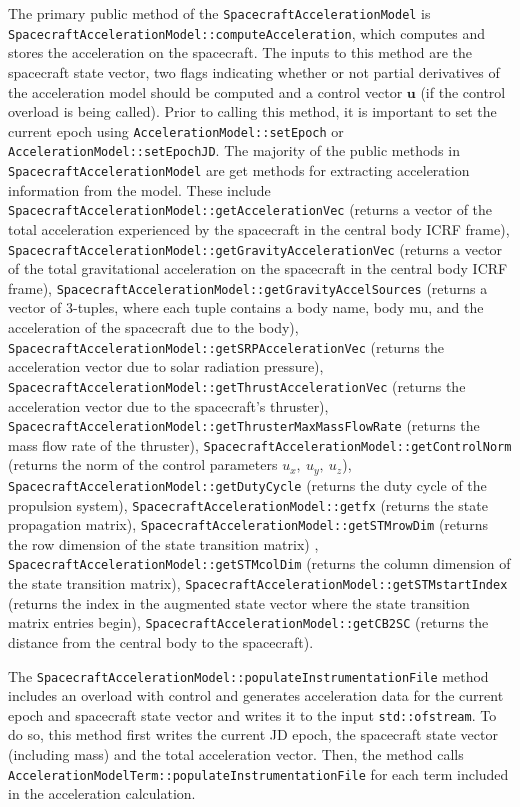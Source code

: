 The primary public method of the \texttt{SpacecraftAccelerationModel} is \texttt{SpacecraftAccelerationModel::computeAcceleration}, which computes and stores the acceleration on the spacecraft. The inputs to this method are the spacecraft state vector, two flags indicating whether or not partial derivatives of the acceleration model should be computed and a control vector $\mathbf{u}$ (if the control overload is being called). Prior to calling this method, it is important to set the current epoch using \texttt{AccelerationModel::setEpoch} or \texttt{AccelerationModel::setEpochJD}. The majority of the public methods in \texttt{SpacecraftAccelerationModel} are get methods for extracting acceleration information from the model. These include \texttt{SpacecraftAccelerationModel::getAccelerationVec} (returns a vector of the total acceleration experienced by the spacecraft in the central body ICRF frame), \texttt{SpacecraftAccelerationModel::getGravityAccelerationVec} (returns a vector of the total gravitational acceleration on the spacecraft in the central body ICRF frame), \texttt{SpacecraftAccelerationModel::getGravityAccelSources} (returns a vector of 3-tuples, where each tuple contains a body name, body mu, and the acceleration of the spacecraft due to the body), \texttt{SpacecraftAccelerationModel::getSRPAccelerationVec} (returns the acceleration vector due to solar radiation pressure), \texttt{SpacecraftAccelerationModel::getThrustAccelerationVec} (returns the acceleration vector due to the spacecraft's thruster), \texttt{SpacecraftAccelerationModel::getThrusterMaxMassFlowRate} (returns the mass flow rate of the thruster), \texttt{SpacecraftAccelerationModel::getControlNorm} (returns the norm of the control parameters $u_x,~u_y,~u_z$), \texttt{SpacecraftAccelerationModel::getDutyCycle} (returns the duty cycle of the propulsion system), \texttt{SpacecraftAccelerationModel::getfx} (returns the state propagation matrix), \texttt{SpacecraftAccelerationModel::getSTMrowDim} (returns the row dimension of the state transition matrix)
, \texttt{SpacecraftAccelerationModel::getSTMcolDim} (returns the column dimension of the state transition matrix), \texttt{SpacecraftAccelerationModel::getSTMstartIndex} (returns the index in the augmented state vector where the state transition matrix entries begin), \texttt{SpacecraftAccelerationModel::getCB2SC} (returns the distance from the central body to the spacecraft).

The \texttt{SpacecraftAccelerationModel::populateInstrumentationFile} method includes an overload with control and generates acceleration data for the current epoch and spacecraft state vector and writes it to the input \texttt{std::ofstream}. To do so, this method first writes the current JD epoch, the spacecraft state vector (including mass) and the total acceleration vector. Then, the method calls \texttt{AccelerationModelTerm::populateInstrumentationFile} for each term included in the acceleration calculation.

